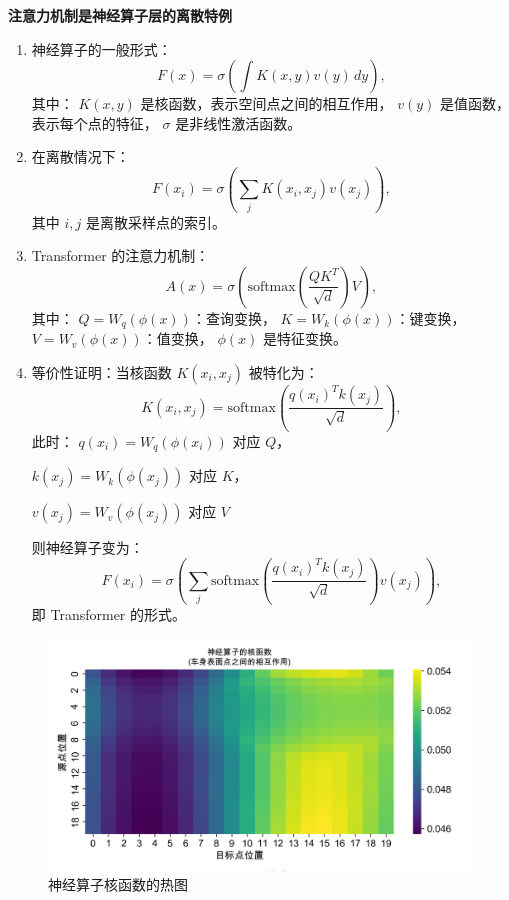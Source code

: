 \documentclass{MMCStyle}
\begin{document}
    \textbf{注意力机制是神经算子层的离散特例}
    \begin{enumerate}
        \item 神经算子的一般形式：
        \[
        F(x) = \sigma\left(\int K(x, y)v(y) \, dy\right),
        \]
        其中：
            \(K(x, y)\) 是核函数，表示空间点之间的相互作用，
            \(v(y)\) 是值函数，表示每个点的特征，
            \(\sigma\) 是非线性激活函数。
        \item 在离散情况下：\cite{6}
        \[
        F(x_i) = \sigma\left(\sum_j K(x_i, x_j)v(x_j)\right),
        \]
        其中 \(i, j\) 是离散采样点的索引。
        \item Transformer 的注意力机制：
        \[
        A(x) = \sigma\left(\text{softmax}\left(\frac{QK^T}{\sqrt{d}}\right)V\right),
        \]
        其中：
            \(Q = W_q(\phi(x))\)：查询变换，
            \(K = W_k(\phi(x))\)：键变换，
            \(V = W_v(\phi(x))\)：值变换，
            \(\phi(x)\) 是特征变换。
        \item 等价性证明：当核函数 \(K(x_i, x_j)\) 被特化为：
        \[
        K(x_i, x_j) = \text{softmax}\left(\frac{q(x_i)^T k(x_j)}{\sqrt{d}}\right),
        \]
        此时： \(q(x_i) = W_q(\phi(x_i))\) 对应 \(Q\)，
        
        \(k(x_j) = W_k(\phi(x_j))\) 对应 \(K\)，
        
        \(v(x_j) = W_v(\phi(x_j))\) 对应 \(V\)
        
        则神经算子变为：
        \[
        F(x_i) = \sigma\left(\sum_j \text{softmax}\left(\frac{q(x_i)^T k(x_j)}{\sqrt{d}}\right)v(x_j)\right),
        \]
        即 Transformer 的形式。
    \end{enumerate}
     
\begin{figure}[H]
\centering%
\includegraphics[width=13 cm]{figure/fig11.png}
\caption{神经算子核函数的热图}\label{fig11}
\end{figure}   
\unskip
\end{document}
